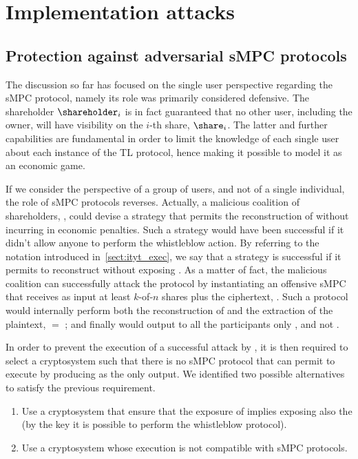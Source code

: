 \section{Implementation attacks}\label{sect:impl_attacks}

\subsection{Protection against adversarial sMPC protocols}\label{sect:impl_mpc}

The discussion so far has focused on the single user perspective regarding the sMPC protocol, namely its role was primarily considered defensive. 
The shareholder $\shareholder_{i}$ is in fact guaranteed that no other user, including the owner, will have visibility on the $i$-th share, $\share_{i}$. 
The latter and further capabilities are fundamental in order to limit the knowledge of each single user about each instance of the TL protocol, hence making it possible to model it as an economic game. 

If we consider the perspective of a group of users, and not of a single individual, the role of sMPC protocols reverses. 
Actually, a malicious coalition of shareholders, \coalition, could devise a strategy that permits the reconstruction of \secret without incurring in economic penalties. 
Such a strategy would have been successful if it didn't allow anyone to perform the whistleblow action. 
By referring to the notation introduced in~\ref{sect:ityt_exec}, we say that a strategy is successful if it permits to reconstruct \plaintext without exposing \key. 
As a matter of fact, the malicious coalition can successfully attack the protocol by instantiating an offensive sMPC that receives as input at least $k$-of-$n$ shares plus the ciphertext, \ciphertext.
Such a protocol would internally perform both the reconstruction of \key and the extraction of the plaintext, \plaintext $=$ \unwrap; and finally would output to all the participants only \plaintext, and not \key. 

In order to prevent the execution of a successful attack by \coalition, it is then required to select a cryptosystem \cipvocabulary such that there is no sMPC protocol that can permit to execute \dec by producing \plaintext as the only output.
We identified two possible alternatives to satisfy the previous requirement.

\begin{enumerate}
	\item Use a cryptosystem that ensure that the exposure of \plaintext implies exposing also the \key (by the key it is possible to perform the whistleblow protocol).
	\item Use a cryptosystem whose execution is not compatible with sMPC protocols.
\end{enumerate}

